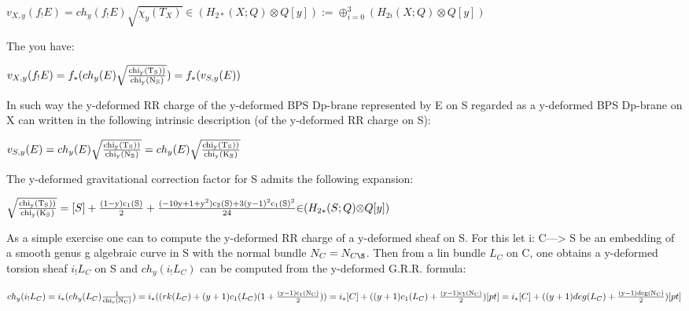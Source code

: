 \documentclass[a4paper,a4paper]{article}
\begin{document}
\begin{center}
{  $ v_{X,y}(f_{!}E)=ch_{y}(f_{!}E)\sqrt{{\chi}_{y}(T_{X})}{\in}(H_{2*}(X;Q){\otimes}Q[y]):={\oplus}_{i=0}^3(H_{2i}(X;Q){\otimes}Q[y])  $ }
\end{center}

The you have:

\begin{center}
{  $ v_{X,y}(f_{!}E)= f_{*}(ch_{y}(E)\sqrt{\frac{\rm chi_{y}(T_S))}{\rm chi_{y}(N_S)}
})=  f_{*}(v_{S,y}(E))$ }
\end{center}

In such way the y-deformed RR charge of the y-deformed BPS Dp-brane represented by E on S regarded as a y-deformed BPS Dp-brane on  X can written in the following intrinsic description (of the y-deformed RR charge on S):

\begin{center}
{  $ v_{S,y}(E)= ch_{y}(E)\sqrt{\frac{\rm chi_{y}(T_S))}{\rm chi_{y}(N_S)}
}=ch_{y}(E)\sqrt{\frac{\rm chi_{y}(T_S))}{\rm chi_{y}(K_S)}
}$ }
\end{center}

The y-deformed gravitational correction factor for S admits the following expansion:

\begin{center}
\setlength{\baselineskip}{30pt}
{  $\sqrt{\frac{\rm chi_{y}(T_S))}{\rm chi_{y}(K_S)}
} = [S]+\frac{\rm (1-y)c_1(S)}{\rm 2}+\frac{\rm (-10y+1+y^2)c_2(S)+3(y-1)^2c_1(S)^2}{\rm 24}  {\in} (H_{2*}(S;Q){\otimes}Q[y])$ }
\end{center}

As a simple exercise one can to compute the y-deformed RR charge of a y-deformed sheaf on S. For this let i: C---> S be an embedding of a smooth genus g algebraic curve in S with the normal bundle $N_{C}=N_{C\S}$. Then from a lin bundle $L_{C}$ on C, one obtains a y-deformed torsion sheaf $i_{!}L_{C}$ on S and $ch_{y}(i_{!}L_{C})$ can be computed from the y-deformed G.R.R. formula:


\begin{center}
\setlength{\baselineskip}{40pt}   
{  $ ch_y(i_{!}L_{C}) = i_{*}(ch_{y}(L_{C})\frac{\rm 1}{\rm chi_{y}(N_C)})=i_{*}((rk(L_{C})+(y+1)c_{1}(L_{C})(1+\frac{\rm (y-1)c_{1}(N_{C})}{\rm 2}))=i_{*}[C]+((y+1)c_{1}(L_{C})+\frac{\rm (y-1)c_{1}(N_{C})}{\rm 2})[pt]=i_{*}[C]+((y+1)deg(L_{C})+\frac{\rm (y-1)deg(N_{C})}{\rm 2})[pt]$ }
\end{center}
\end{document}
